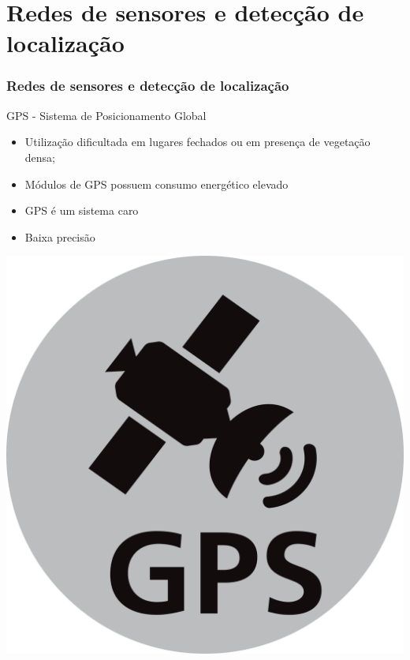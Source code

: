\documentclass{beamer}
\begin{document}
\section{Redes de sensores e detecção de localização}
\begin{frame}
	\frametitle{\normalsize Redes de sensores e detecção de localização}
	\begin{flushleft}
		GPS - Sistema de Posicionamento Global
		\begin{itemize}
			\item Utilização dificultada em lugares fechados ou em presença de vegetação densa;
			\item Módulos de GPS possuem consumo energético elevado
			\item GPS é um sistema caro
			\item Baixa precisão
		\end{itemize}
	\end{flushleft}
	\begin{flushright}
		\includegraphics[scale=0.2]{gps}
	\end{flushright}
\end{frame}
\end{document}
